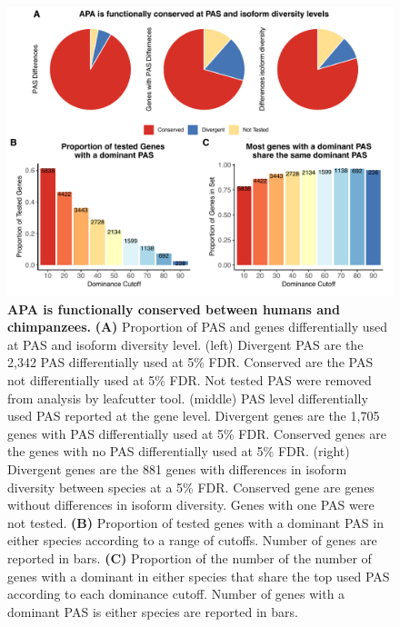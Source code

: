  \begin{figure}
\centering
\includegraphics[width=5in]{img/ch03/fig2.pdf}
\caption[APA is functionally conserved between humans and chimpanzees]{\textbf{APA is functionally conserved between humans and chimpanzees.} \small {\bf (A)} Proportion of PAS and genes differentially used at PAS and isoform diversity level. (left) Divergent PAS are the 2,342 PAS differentially used at 5\% FDR. Conserved are the PAS not differentially used at 5\% FDR. Not tested PAS were removed from analysis by leafcutter tool. (middle) PAS level differentially used PAS reported at the gene level. Divergent genes are the 1,705 genes with PAS differentially used at 5\% FDR. Conserved genes are the genes with no PAS differentially used at 5\% FDR.  (right) Divergent genes are the 881 genes with differences in isoform diversity between species at a 5\% FDR. Conserved gene are genes without differences in isoform diversity. Genes with one PAS were not tested. {\bf (B)}  Proportion of tested genes with a dominant PAS in either species according to a range of cutoffs. Number of genes are reported in bars. {\bf (C)} Proportion of the number of the number of genes with a dominant in either species that share the top used PAS according to each dominance cutoff. Number of genes with a dominant PAS is either species are reported in bars.} 
\label{fig:Ch3fig2}
\end{figure}



